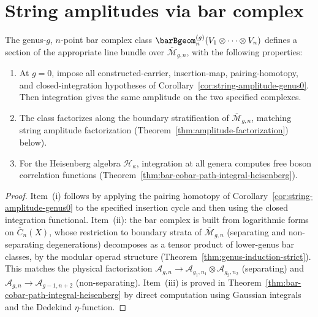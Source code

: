 \section{String amplitudes via bar complex}

\begin{theorem}
\label{thm:bar-string-integrand}
The genus-$g$, $n$-point bar complex class
$\barBgeom^{(g)}_n(V_1 \otimes \cdots \otimes V_n)$
defines a section of the appropriate line bundle over
$\overline{\mathcal{M}}_{g,n}$, with the following
properties:
\begin{enumerate}[label=\textup{(\roman*)}]
\item At $g=0$, impose all constructed-carrier, insertion-map, pairing-homotopy, and closed-integration hypotheses of Corollary~\ref{cor:string-amplitude-genus0}.
  Then integration gives the same amplitude on the two specified complexes.
\item The class factorizes along the boundary
  stratification of $\overline{\mathcal{M}}_{g,n}$,
  matching string amplitude factorization
  \textup{(}Theorem~\textup{\ref{thm:amplitude-factorization})}
  below\textup{)}.
\item For the Heisenberg algebra $\mathcal{H}_\kappa$,
  integration at all genera computes free boson
  correlation functions
  \textup{(}Theorem~\textup{\ref{thm:bar-cobar-path-integral-heisenberg})}.
\end{enumerate}
\end{theorem}

\begin{proof}
Item~(i) follows by applying the pairing homotopy of Corollary~\ref{cor:string-amplitude-genus0} to the specified insertion cycle and then using the closed integration functional.
Item~(ii): the bar complex is built from logarithmic
forms on $\overline{C}_n(X)$, whose restriction to
boundary strata of $\overline{\mathcal{M}}_{g,n}$
(separating and non-separating degenerations) decomposes
as a tensor product of lower-genus bar classes, by the
modular operad structure
(Theorem~\ref{thm:genus-induction-strict}).  This
matches the physical factorization
$\mathcal{A}_{g,n} \to \mathcal{A}_{g_1,n_1} \otimes
\mathcal{A}_{g_2,n_2}$ (separating) and
$\mathcal{A}_{g,n} \to \mathcal{A}_{g-1,n+2}$
(non-separating).
Item~(iii) is proved in
Theorem~\ref{thm:bar-cobar-path-integral-heisenberg} by
direct computation using Gaussian integrals and the
Dedekind $\eta$-function.
\end{proof}

